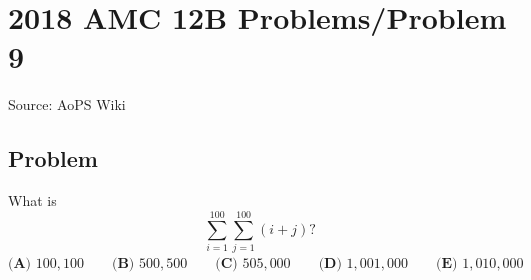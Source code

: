 \documentclass[12pt]{article}
\begin{document}
\section*{{2018 AMC 12B Problems/Problem 9}}
Source: AoPS Wiki

\subsection*{Problem}
What is \[\sum^{100}_{i=1} \sum^{100}_{j=1} (i+j) ?\] $\textbf{(A) }100{,}100 \qquad \textbf{(B) }500{,}500\qquad \textbf{(C) }505{,}000 \qquad \textbf{(D) }1{,}001{,}000 \qquad \textbf{(E) }1{,}010{,}000 \qquad$
\end{document}
